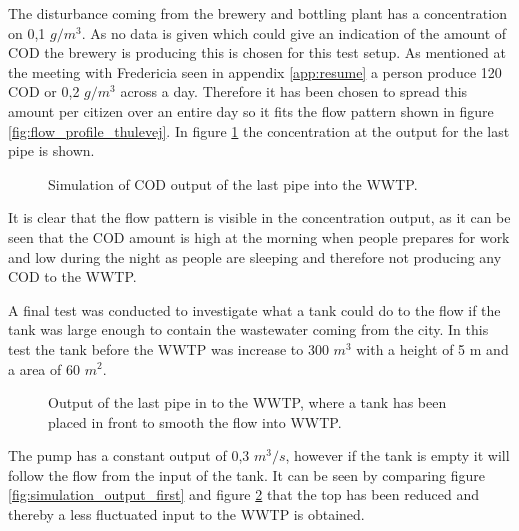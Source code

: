 The disturbance coming from the brewery and bottling plant has a concentration on 0,1 $g/m^3$. As no data is given which could give an indication of the amount of COD the brewery is producing this is chosen for this test setup. As mentioned at the meeting with Fredericia seen in appendix \ref{app:resume} a person produce 120 COD or 0,2 $g/m^3$ across a day. Therefore it has been chosen to spread this amount per citizen over an entire day so it fits the flow pattern shown in figure \ref{fig:flow_profile_thulevej}. In figure \ref{fig:simulation_output_first_concentration} the concentration at the output for the last pipe is shown.

\begin{figure}[H]
\centering

\caption{Simulation of COD output of the last pipe into the WWTP.}
\label{fig:simulation_output_first_concentration}
\end{figure}  

It is clear that the flow pattern is visible in the concentration output, as it can be seen that the COD amount is high at the morning when people prepares for work and low during the night as people are sleeping and therefore not producing any COD to the WWTP.  


A final test was conducted to investigate what a tank could do to the flow if the tank was large enough to contain the wastewater coming from the city. In this test the tank before the WWTP was increase to 300 $m^3$ with a height of 5 m and a area of 60 $m^2$.

\begin{figure}[H]
\centering

\caption{Output of the last pipe in to the WWTP, where a tank has been placed in front to smooth the flow into WWTP.}
\label{fig:simulation_output_second}
\end{figure} 
The pump has a constant output of 0,3 $m^3/s$, however if the tank is empty it will follow the flow from the input of the tank. It can be seen by comparing figure \ref{fig:simulation_output_first} and figure \ref{fig:simulation_output_second} that the top has been reduced and thereby a less fluctuated input to the WWTP is obtained.   
			   